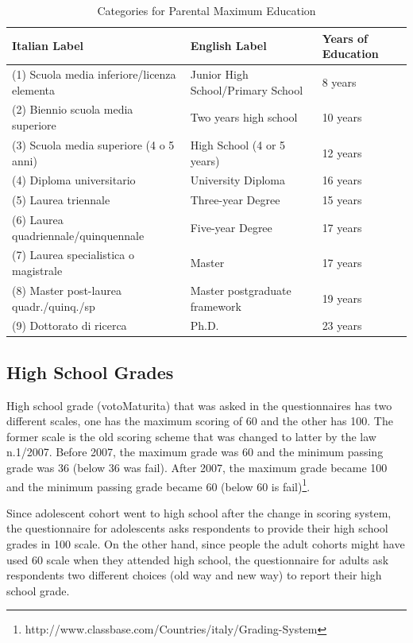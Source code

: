 \begin{table}[H]
\caption{Categories for Parental Maximum Education} \label{tab:par-maxedu}
\begin{center}
\begin{tabular}{L{4.3cm} L{4.3cm} L{4.3cm}}
\toprule
\textbf{Italian Label} & \textbf{English Label} & \textbf{Years of Education} \\ \midrule
	(1) Scuola media inferiore/licenza elementa &	Junior High School/Primary School		& 8 years \\
	(2) Biennio scuola media superiore & 				Two years high school								& 10 years \\
	(3) Scuola media superiore (4 o 5 anni) & 		High School (4 or 5 years)								& 12 years \\
	(4) Diploma universitario &	University Diploma & 16 years \\
	(5) Laurea triennale &	Three-year Degree &	15 years \\
	(6) Laurea quadriennale/quinquennale &   	Five-year Degree & 17 years \\
	(7) Laurea specialistica o magistrale & 			Master & 17 years \\
	(8) Master post-laurea quadr./quinq./sp  & Master postgraduate framework			& 19 years \\
	(9) Dottorato di ricerca 	& Ph.D.	& 23 years \\ \bottomrule
\end{tabular}
\end{center}
\end{table}

\subsection{High School Grades}
High school grade (votoMaturita) that was asked in the questionnaires has two different scales, one has the maximum scoring of 60 and the other has 100. The former scale is the old scoring scheme that was changed to latter by the law n.1/2007. Before 2007, the maximum grade was 60 and the minimum passing grade was 36 (below 36 was fail). After 2007, the maximum grade became 100 and the minimum passing grade became 60 (below 60 is fail)\footnote{http://www.classbase.com/Countries/italy/Grading-System}.

Since adolescent cohort went to high school after the change in scoring system, the questionnaire for adolescents asks respondents to provide their high school grades in 100 scale. On the other hand, since people the adult cohorts might have used 60 scale when they attended high school, the questionnaire for adults ask respondents two different choices (old way and new way) to report their high school grade. 

